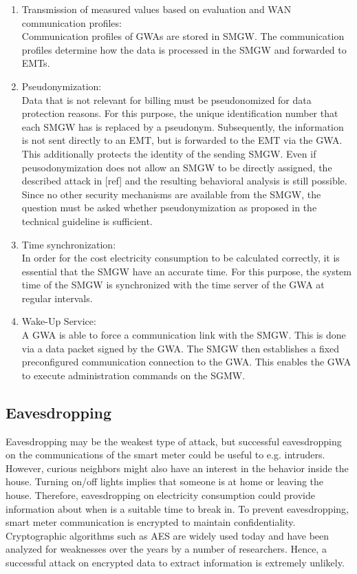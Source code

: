 \begin{enumerate}
\item Transmission of measured values based on evaluation and WAN communication profiles:\\
Communication profiles of GWAs are stored in SMGW. The communication profiles determine how the data is processed in the SMGW and forwarded to EMTs.

\item Pseudonymization:\\
Data that is not relevant for billing must be pseudonomized for data protection reasons. For this purpose, the unique identification number that each SMGW has is replaced by a pseudonym. Subsequently, the information is not sent directly to an EMT, but is forwarded to the EMT via the GWA. This additionally protects the identity of the sending SMGW.%
Even if peusodonymization does not allow an SMGW to be directly assigned, the described attack in [ref] and the resulting behavioral analysis is still possible. Since no other security mechanisms are available from the SMGW, the question must be asked whether pseudonymization as proposed in the technical guideline is sufficient.

\item Time synchronization:\\
In order for the cost electricity consumption to be calculated correctly, it is essential that the SMGW have an accurate time. For this purpose, the system time of the SMGW is synchronized with the time server of the GWA at regular intervals.

\item Wake-Up Service:\\
A GWA is able to force a communication link with the SMGW. This is done via a data packet signed by the GWA. The SMGW then establishes a fixed preconfigured communication connection to the GWA. This enables the GWA to execute administration commands on the SGMW. 
\end{enumerate}
\subsection{Eavesdropping}
Eavesdropping may be the weakest type of attack, but successful eavesdropping on the communications of the smart meter could be useful to e.g. intruders. However, curious neighbors might also have an interest in the behavior inside the house. Turning on/off lights implies that someone is at home or leaving the house. Therefore, eavesdropping on electricity consumption could provide information about when is a suitable time to break in. To prevent eavesdropping, smart meter communication is encrypted to maintain confidentiality. Cryptographic algorithms such as AES are widely used today and have been analyzed for weaknesses over the years by a number of researchers. Hence, a successful attack on encrypted data to extract information is extremely unlikely.
